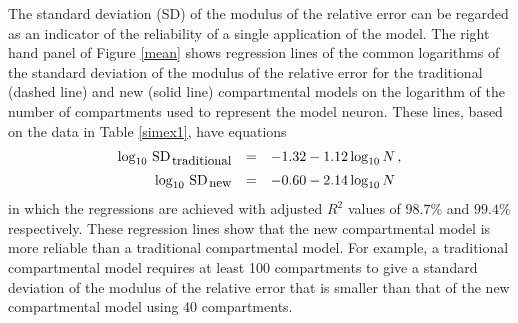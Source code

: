 
The standard deviation (SD) of the modulus of the relative error
can be regarded as an indicator of the reliability of a single
application of the model. The right hand panel of Figure
\ref{mean} shows regression lines of the common logarithms of the
standard deviation of the modulus of the relative error for the
traditional (dashed line) and new (solid line) compartmental
models on the logarithm of the number of compartments used to
represent the model neuron. These lines, based on the data in
Table \ref{simex1}, have equations
\begin{equation}\label{mean2}
\begin{array}{rcl}
\log_{10}\,\mbox{SD}_\mathrm{\,\small traditional} & = &
-1.32-1.12\log_{10}N\,, \\[5pt]
\log_{10}\,\mbox{SD}_\mathrm{\,\small new} & = &
-0.60-2.14\log_{10}N
\end{array}
\end{equation}
in which the regressions are achieved with adjusted $R^2$ values
of $98.7\%$ and $99.4\%$ respectively. These regression lines show
that the new compartmental model is more reliable than a
traditional compartmental model. For example, a traditional
compartmental model requires at least 100 compartments to give a
standard deviation of the modulus of the relative error that is
smaller than that of the new compartmental model using 40
compartments.

